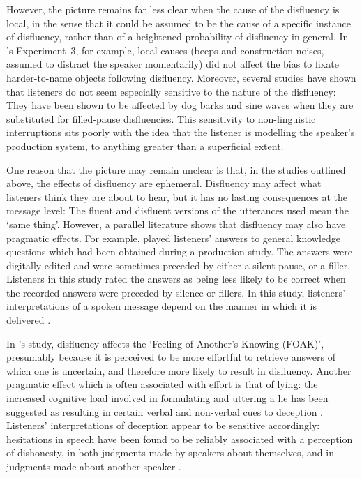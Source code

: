 \documentclass[a4paper,man,natbib]{apa6}
\begin{document}
However, the picture remains far less clear when the cause of the disfluency is local, in the sense that it could be assumed to be the cause of a specific instance of disfluency, rather than of a heightened probability of disfluency in general.
In \citeauthor{Arnold2007}'s Experiment~3, for example, local causes (beeps and construction noises, assumed to distract the speaker momentarily) did not affect the bias to fixate harder-to-name objects following disfluency.
Moreover, several studies have shown that listeners do not seem especially sensitive to the nature of the disfluency:  They have been shown to be affected by dog barks \citep{bailey2003disfluencies} and sine waves \citep{corley2011helps} when they are substituted for filled-pause disfluencies.
This sensitivity to non-linguistic interruptions sits poorly with the idea that the listener is modelling the speaker's production system, to anything greater than a superficial extent.

One reason that the picture may remain unclear is that, in the studies outlined above, the effects of disfluency are ephemeral.
Disfluency may affect what listeners think they are about to hear, but it has no lasting consequences at the message level:  The fluent and disfluent versions of the utterances used mean the `same thing'.
However, a parallel literature shows that disfluency may also have pragmatic effects.
%
For example, \citet{Brennan1995} played listeners' answers to general knowledge questions which had been obtained during a production study.
The answers were digitally edited and were sometimes preceded by either a silent pause, or a filler.
Listeners in this study rated the answers as being less likely to be correct when the recorded answers were preceded by silence or fillers.
In this study, listeners' interpretations of a spoken message depend on the manner in which it is delivered \citep[see also][]{Swerts2005}.

In \citeauthor{Brennan1995}'s study, disfluency affects the `Feeling of Another's Knowing (FOAK)', presumably because it is perceived to be more effortful to retrieve answers of which one is uncertain, and therefore more likely to result in disfluency.
Another pragmatic effect which is often associated with effort is that of lying: the increased cognitive load involved in formulating and uttering a lie has been suggested as resulting in certain verbal and non-verbal cues to deception \citep{Zuckerman1981}.
Listeners' interpretations of deception appear to be sensitive accordingly: hesitations in speech have been found to be reliably associated with a perception of dishonesty, in both judgments made by speakers about themselves, and in judgments made about another speaker \citep{Zuckerman1981}.
\end{document}
